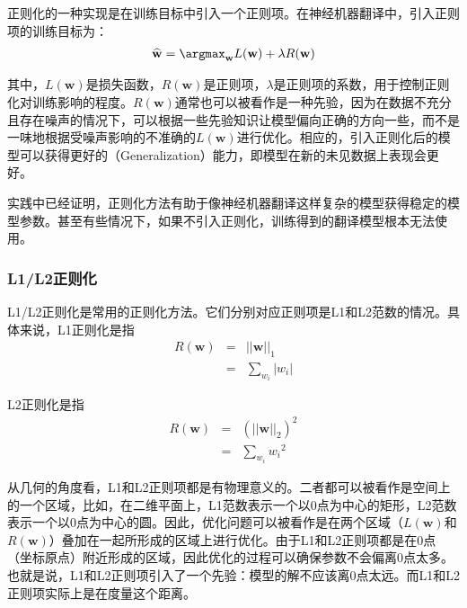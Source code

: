 \parinterval 正则化的一种实现是在训练目标中引入一个正则项。在神经机器翻译中，引入正则项的训练目标为：
\begin{eqnarray}
\widehat{\mathbf{w}}=\argmax_{\mathbf{w}}L(\mathbf{w}) + \lambda R(\mathbf{w})
\label{eq:7-2}
\end{eqnarray}

\noindent 其中，$L(\mathbf{w})$是损失函数，$R(\mathbf{w})$是正则项，$\lambda$是正则项的系数，用于控制正则化对训练影响的程度。$R(\mathbf{w})$通常也可以被看作是一种先验，因为在数据不充分且存在噪声的情况下，可以根据一些先验知识让模型偏向正确的方向一些，而不是一味地根据受噪声影响的不准确的$L(\mathbf{w})$进行优化。相应的，引入正则化后的模型可以获得更好的{\small{}}（Generalization）能力，即模型在新的未见数据上表现会更好。

\parinterval 实践中已经证明，正则化方法有助于像神经机器翻译这样复杂的模型获得稳定的模型参数。甚至有些情况下，如果不引入正则化，训练得到的翻译模型根本无法使用。


\subsubsection{L1/L2正则化}

\parinterval L1/L2正则化是常用的正则化方法。它们分别对应正则项是L1和L2范数的情况。具体来说，L1正则化是指
\begin{eqnarray}
R(\mathbf{w}) & = & \big| |\mathbf{w}| {\big|}_1 \\
			     & =  &\sum_{w_i}|w_i| \nonumber
\label{eq:7-3}
\end{eqnarray}

\parinterval L2正则化是指
\begin{eqnarray}
R(\mathbf{w}) & = & (\big| |\mathbf{w}| {\big|}_2)^2 \\
			     & =  &\sum_{w_i}{w_i}^2 \nonumber
\label{eq:7-4}
\end{eqnarray}

\parinterval 从几何的角度看，L1和L2正则项都是有物理意义的。二者都可以被看作是空间上的一个区域，比如，在二维平面上，L1范数表示一个以0点为中心的矩形，L2范数表示一个以0点为中心的圆。因此，优化问题可以被看作是在两个区域（$L(\mathbf{w})$和$R(\mathbf{w})$）叠加在一起所形成的区域上进行优化。由于L1和L2正则项都是在0点（坐标原点）附近形成的区域，因此优化的过程可以确保参数不会偏离0点太多。也就是说，L1和L2正则项引入了一个先验：模型的解不应该离0点太远。而L1和L2正则项实际上是在度量这个距离。

